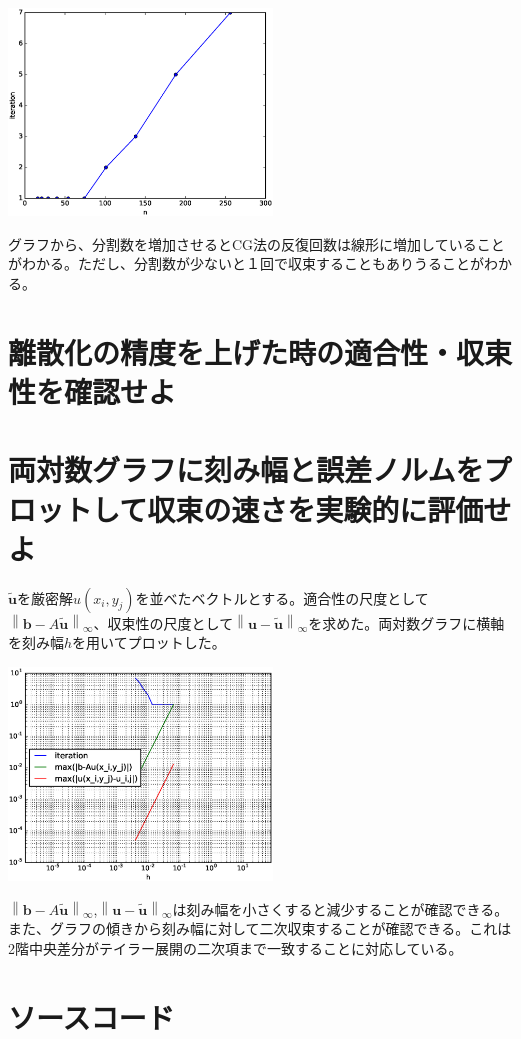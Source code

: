 \documentclass[a4j]{jarticle}
\begin{document}
\includegraphics[width=7cm]{iteration.eps}


グラフから、分割数を増加させるとCG法の反復回数は線形に増加していることがわかる。ただし、分割数が少ないと１回で収束することもありうることがわかる。

\section{離散化の精度を上げた時の適合性・収束性を確認せよ}


\section{両対数グラフに刻み幅と誤差ノルムをプロットして収束の速さを実験的に評価せよ}


$\tilde{\bm u}$を厳密解$u(x_i,y_j)$を並べたベクトルとする。適合性の尺度として$ \left\| {\bm b} - A\tilde{\bm u} \right\|_\infty$、収束性の尺度として$\left\| {\bm u}-\tilde{\bm u} \right\|_\infty$を求めた。両対数グラフに横軸を刻み幅$h$を用いてプロットした。


\includegraphics[width=7cm]{loglog.eps}

$ \left\| {\bm b} - A\tilde{\bm u} \right\|_\infty$,$\left\| {\bm u}-\tilde{\bm u} \right\|_\infty$は刻み幅を小さくすると減少することが確認できる。また、グラフの傾きから刻み幅に対して二次収束することが確認できる。これは2階中央差分がテイラー展開の二次項まで一致することに対応している。

\section{ソースコード}



\end{document}
